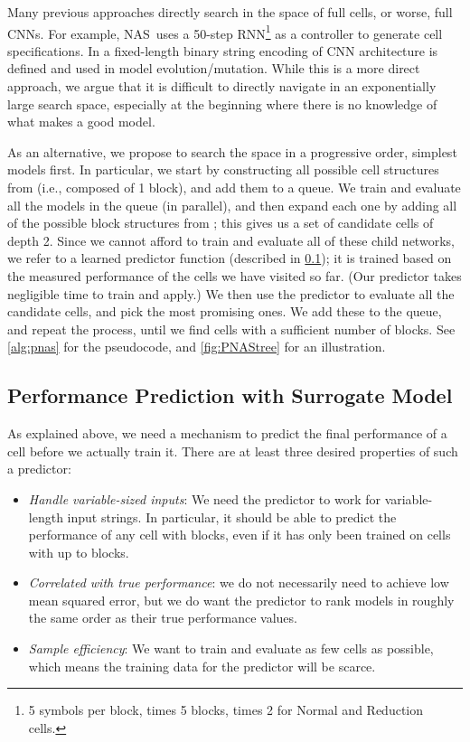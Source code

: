 \documentclass[runningheads]{llncs}
\newcommand{\NAS}{NAS}
\newcommand{\NAScell}{\NAS}
\begin{document}
Many previous approaches directly search in the space of full cells,
or worse,
full CNNs.
For example, \NAScell\ uses a 50-step RNN\footnote{5 symbols per block, times 5 blocks, times 2 for Normal and Reduction cells.
} as a controller to generate cell specifications.
In \cite{DBLP:journals/corr/XieY17} a fixed-length binary string encoding of CNN architecture is defined and used in model evolution/mutation.
While this is a more direct approach, we argue that it is difficult to directly navigate in an exponentially large search space, especially at the beginning where there is no knowledge of what makes a good model.

As an alternative, we propose to search the space in a progressive order,
simplest models first.
In particular, we start by constructing all possible cell structures 
from  (i.e., composed of 1 block),
and add them to a queue.
We train and evaluate all the models in the queue (in parallel),
and then expand each one by
adding all of the possible  block structures from ;
this gives us a set of
 candidate cells of depth 2.
Since 
we cannot afford to 
train and evaluate  all of these child networks,
 we refer to a learned predictor function
(described in \cref{sec:surrogate});
it is trained based on the measured performance of the cells we have visited so far.
(Our predictor takes negligible time to train and apply.)
We then use the predictor to evaluate all the candidate cells,
and pick the  most promising ones.
We add these to the queue, and repeat the process,
until we find cells with a sufficient number  of blocks.
See \cref{alg:pnas} for the pseudocode,
and \cref{fig:PNAStree} for an illustration.


\subsection{Performance Prediction with Surrogate Model}
\label{sec:surrogate}


As explained above, we need a mechanism to predict the final
performance of a cell before we actually train it.
There are at least three desired properties of such a predictor:
\begin{itemize}
    \item \textit{Handle variable-sized inputs}: We need the predictor to work for variable-length input strings.
    In particular, it should be able to predict the performance of any cell with  blocks, even if it has only been trained on cells with up to  blocks.
    


  \item \textit{Correlated with  true performance}: we do not necessarily need to achieve low mean squared error, but we do want the predictor to rank models in roughly the same order as their true performance values.
 
    
    \item \textit{Sample efficiency}: We want to train and evaluate as few cells as possible, which means the training data for the predictor will be scarce. 
\end{itemize}
\end{document}
